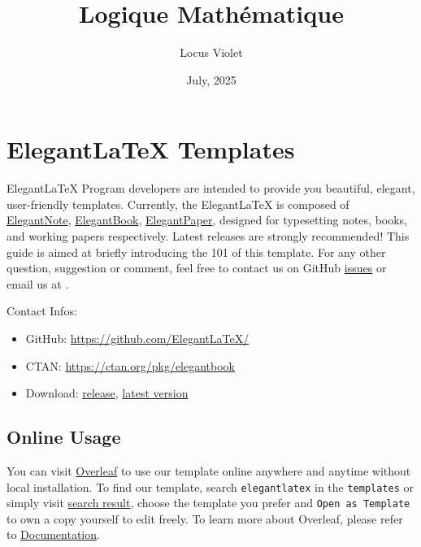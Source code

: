 \documentclass[11pt]{elegantbook}
\title{Logique Mathématique}
\author{Locus Violet}
\date{July, 2025}
\begin{document}
\maketitle

\frontmatter
\tableofcontents

\mainmatter

\chapter{Elegant\LaTeX{} Templates}
Elegant\LaTeX{} Program developers are intended to provide you beautiful, elegant, user-friendly templates. Currently, 
the Elegant\LaTeX{} is composed of \href{https://github.com/ElegantLaTeX/ElegantNote}{ElegantNote}, 
\href{https://github.com/ElegantLaTeX/ElegantBook}{ElegantBook}, \href{https://github.com/ElegantLaTeX/ElegantPaper}{ElegantPaper}, 
designed for typesetting notes, books, and working papers respectively. Latest releases are strongly recommended! 
This guide is aimed at briefly introducing the 101 of this template. For any other question, suggestion or comment, 
feel free to contact us on GitHub \href{https://github.com/ElegantLaTeX/ElegantBook/issues}{issues} or email us at .

Contact Infos:
\begin{itemize}
  \item GitHub: \href{https://github.com/ElegantLaTeX/}{https://github.com/ElegantLaTeX/}
  \item CTAN: \href{https://ctan.org/pkg/elegantbook}{https://ctan.org/pkg/elegantbook}
  \item Download: \href{https://github.com/ElegantLaTeX/ElegantBook/releases}{release}, \href{https://github.com/ElegantLaTeX/ElegantBook/archive/master.zip}{latest version}
\end{itemize}


\section{Online Usage}
You can visit \href{https://www.overleaf.com/}{Overleaf} to use our template online anywhere and anytime without local installation. To find our template, search \lstinline{elegantlatex} in the \lstinline{templates} or simply visit \href{https://www.overleaf.com/latex/templates?addsearch=elegantlatex}{search result}, choose the template you prefer and \lstinline{Open as Template} to own a copy yourself to edit freely. To learn more about Overleaf, please refer to \href{https://www.overleaf.com/learn}{Documentation}.
\end{document}
